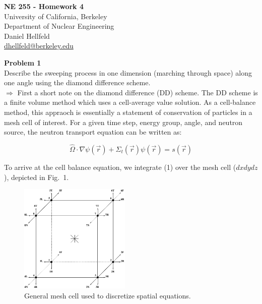 \documentclass[10pt]{article}
\begin{document}
\begin{centering}
\textbf{\large NE 255 - Homework 4}\\
\vspace{10pt}
University of California, Berkeley\\
Department of Nuclear Engineering\\
\vspace{10pt}
Daniel Hellfeld\\
\href{mailto:dhellfeld@berkeley.edu}{dhellfeld@berkeley.edu}\\
\end{centering}






\vspace{20pt}
\noindent \textbf{Problem 1}\\
Describe the sweeping process in one dimension (marching through space) along one angle using the diamond difference scheme.\\

$\Rightarrow$ First a short note on the diamond difference (DD) scheme. The DD scheme is a finite volume method which uses a cell-average value solution. As a cell-balance method, this appraoch is essentially a statement of conservation of particles in a mesh cell of interest. For a given time step, energy group, angle, and neutron source, the neutron transport equation can be written as:

\begin{equation}
        \hat{\Omega} \cdot \nabla \psi(\vec{r}) + \Sigma_t(\vec{r})\psi(\vec{r}) = s(\vec{r})
\end{equation}

To arrive at the cell balance equation, we integrate (1) over the mesh cell ($dxdydz$), depicted in Fig.~1.

\begin{figure}[htb]
    \centering
    \includegraphics[width=150pt]{Figures/mesh_cell_sn}
    \caption{General mesh cell used to discretize spatial equations.}
    \label{cellmesh}
\end{figure}
\end{document}
